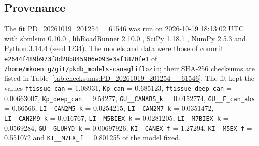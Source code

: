 \documentclass{article}
\begin{document}
\subsection{Provenance}

The fit PD\_20261019\_201254\_\_61546 was run on 2026-10-19 18:13:02 UTC with sbmlsim 0.10.0 \cite{Koenig2026_sbmlsim}, libRoadRunner 2.10.0 \cite{Welsh2023}, SciPy 1.18.1 \cite{Virtanen2020}, NumPy 2.5.3 \cite{Harris2020} and Python 3.14.4 (seed 1234). The models and data were those of commit \texttt{e2644f489b973f8d28b845906e093e3af1870fe1} of \texttt{/home/mkoenig/git/pkdb\_models-canagliflozin}; their SHA-256 checksums are listed in Table~\ref{tab:checksums:PD_20261019_201254__61546}. The fit kept the values \texttt{ftissue\_can} = 1.08931, \texttt{Kp\_can} = 0.685123, \texttt{ftissue\_deep\_can} = 0.00663007, \texttt{Kp\_deep\_can} = 9.54277, \texttt{GU\_\_CANABS\_k} = 0.0152774, \texttt{GU\_\_F\_can\_abs} = 0.66566, \texttt{LI\_\_CAN2M5\_k} = 0.0254215, \texttt{LI\_\_CAN2M7\_k} = 0.0351472, \texttt{LI\_\_CAN2M9\_k} = 0.016767, \texttt{LI\_\_M5BIEX\_k} = 0.0281205, \texttt{LI\_\_M7BIEX\_k} = 0.0569284, \texttt{GU\_\_GLUHYD\_k} = 0.00697926, \texttt{KI\_\_CANEX\_f} = 1.27294, \texttt{KI\_\_M5EX\_f} = 0.551072 and \texttt{KI\_\_M7EX\_f} = 0.801255 of the model fixed.
\end{document}
